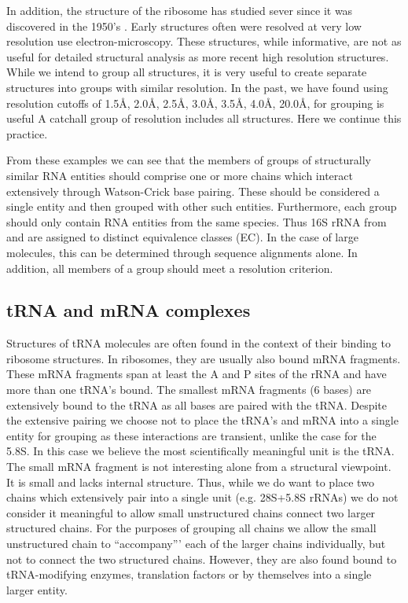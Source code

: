In addition, the structure of the ribosome has studied sever since it was
discovered in the 1950's \cite{McQuillen1959, BEER1960, ABDUL-NOUR1960,
OHTAKA1963, SANTER1963}. Early structures \cite{Mueller2000} often were resolved
at very low resolution use electron-microscopy. These structures, while
informative, are not as useful for detailed structural analysis as more recent
high resolution structures. While we intend to group all structures, it is very
useful to create separate structures into groups with similar resolution. In the
past, we have found using resolution cutoffs of 1.5{\AA}, 2.0{\AA}, 2.5{\AA},
3.0{\AA}, 3.5{\AA}, 4.0{\AA}, 20.0{\AA}, for grouping is useful A catchall group
of resolution includes all structures. Here we continue this practice.

From these examples we can see that the members of groups of structurally
similar RNA entities should comprise one or more chains which interact
extensively through Watson-Crick base pairing. These should be considered a
single entity and then grouped with other such entities. Furthermore, each group
should only contain RNA entities from the same species. Thus 16S rRNA from \EC{}
and \TT{} are assigned to distinct equivalence classes (EC). In the case of
large molecules, this can be determined through sequence alignments alone. In
addition, all members of a group should meet a resolution criterion.

\subsection{tRNA and mRNA complexes}

Structures of tRNA molecules are often found in the context of their binding to
ribosome structures. In ribosomes, they are usually also bound mRNA fragments.
These mRNA fragments span at least the A and P sites of the rRNA and have more
than one tRNA's bound. The smallest mRNA fragments (6 bases) are extensively
bound to the tRNA as all bases are paired with the tRNA. Despite the extensive
pairing we choose not to place the tRNA's and mRNA into a single entity for
grouping as these interactions are transient, unlike the case for the 5.8S. In
this case we believe the most scientifically meaningful unit is the tRNA. The
small mRNA fragment is not interesting alone from a structural viewpoint. It is
small and lacks internal structure. Thus, while we do want to place two chains
which extensively pair into a single unit (e.g. 28S+5.8S rRNAs) we do not
consider it meaningful to allow small unstructured chains connect two larger
structured chains. For the purposes of grouping all chains we allow the small
unstructured chain to ``accompany''' each of the larger chains individually, but
not to connect the two structured chains. However, they are also found bound to
tRNA-modifying enzymes, translation factors or by themselves into a single
larger entity.

